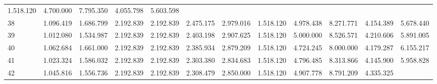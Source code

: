 \begin{tabular}{llllllllllll}
  \multicolumn{1}{r}{1.518.120} &
  \multicolumn{1}{r}{4.700.000} &
  \multicolumn{1}{r}{7.795.350} &
  \multicolumn{1}{r}{4.055.798} &
  \multicolumn{1}{r}{5.603.598} \\
\multicolumn{1}{l}{\hspace{1em}38} &
  \multicolumn{1}{|r}{1.096.419} &
  \multicolumn{1}{r}{1.686.799} &
  \multicolumn{1}{r}{2.192.839} &
  \multicolumn{1}{r}{2.192.839} &
  \multicolumn{1}{r}{2.475.175} &
  \multicolumn{1}{r}{2.979.016} &
  \multicolumn{1}{r}{1.518.120} &
  \multicolumn{1}{r}{4.978.438} &
  \multicolumn{1}{r}{8.271.771} &
  \multicolumn{1}{r}{4.154.389} &
  \multicolumn{1}{r}{5.678.440} \\
\multicolumn{1}{l}{\hspace{1em}39} &
  \multicolumn{1}{|r}{1.012.080} &
  \multicolumn{1}{r}{1.534.987} &
  \multicolumn{1}{r}{2.192.839} &
  \multicolumn{1}{r}{2.192.839} &
  \multicolumn{1}{r}{2.403.198} &
  \multicolumn{1}{r}{2.907.625} &
  \multicolumn{1}{r}{1.518.120} &
  \multicolumn{1}{r}{5.000.000} &
  \multicolumn{1}{r}{8.526.571} &
  \multicolumn{1}{r}{4.210.606} &
  \multicolumn{1}{r}{5.891.005} \\
\multicolumn{1}{l}{\hspace{1em}40} &
  \multicolumn{1}{|r}{1.062.684} &
  \multicolumn{1}{r}{1.661.000} &
  \multicolumn{1}{r}{2.192.839} &
  \multicolumn{1}{r}{2.192.839} &
  \multicolumn{1}{r}{2.385.934} &
  \multicolumn{1}{r}{2.879.209} &
  \multicolumn{1}{r}{1.518.120} &
  \multicolumn{1}{r}{4.724.245} &
  \multicolumn{1}{r}{8.000.000} &
  \multicolumn{1}{r}{4.179.287} &
  \multicolumn{1}{r}{6.155.217} \\
\multicolumn{1}{l}{\hspace{1em}41} &
  \multicolumn{1}{|r}{1.023.324} &
  \multicolumn{1}{r}{1.586.032} &
  \multicolumn{1}{r}{2.192.839} &
  \multicolumn{1}{r}{2.192.839} &
  \multicolumn{1}{r}{2.303.380} &
  \multicolumn{1}{r}{2.834.683} &
  \multicolumn{1}{r}{1.518.120} &
  \multicolumn{1}{r}{4.796.485} &
  \multicolumn{1}{r}{8.313.866} &
  \multicolumn{1}{r}{4.145.900} &
  \multicolumn{1}{r}{5.958.828} \\
\multicolumn{1}{l}{\hspace{1em}42} &
  \multicolumn{1}{|r}{1.045.816} &
  \multicolumn{1}{r}{1.556.736} &
  \multicolumn{1}{r}{2.192.839} &
  \multicolumn{1}{r}{2.192.839} &
  \multicolumn{1}{r}{2.308.479} &
  \multicolumn{1}{r}{2.850.000} &
  \multicolumn{1}{r}{1.518.120} &
  \multicolumn{1}{r}{4.907.778} &
  \multicolumn{1}{r}{8.791.209} &
  \multicolumn{1}{r}{4.335.325} &

\end{tabular}
